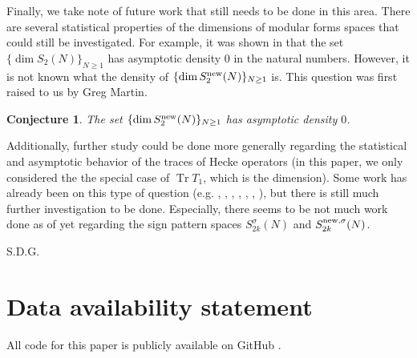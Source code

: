 \documentclass[12pt,letterpaper,reqno]{amsart}
\newtheorem{conjecture}[theorem]{Conjecture}
\theoremstyle{definition}
\numberwithin{equation}{section}
\numberwithin{figure}{section}
\numberwithin{table}{section}
\DeclareMathOperator{\Tr}{Tr}
\newcommand{\nw}{{\textnormal{new}}}
\begin{document}
Finally, we take note of future work that still needs to be done in this area. There are several statistical properties of the dimensions of modular forms spaces that could still be investigated. For example, it was shown in \cite{csirik} that the set $\{ \dim S_2(N) \}_{N\ge 1}$ has asymptotic density $0$ in the natural numbers. However, it is not known what the density of $\{ \dim S_2^\nw(N) \}_{N\ge 1}$ is. This question was first raised to us by Greg Martin.
\begin{conjecture}
    The set $\{ \dim S_2^\nw(N) \}_{N\ge 1}$ has asymptotic density $0$.
\end{conjecture}

Additionally, further study could be done more generally regarding the statistical and asymptotic behavior of the traces of Hecke operators (in this paper, we only considered the the special case of $\Tr T_1$, which is the dimension). Some work has already been on this type of question (e.g. \cite{rouse}, \cite{chiriac}, \cite{chiriac-jorza}, \cite{nonrep}, \cite{ross-xue}, \cite{nonvan-new}, \cite{rth-coeff}), but there is still much further investigation to be done. Especially, there seems to be not much work done as of yet regarding the sign pattern spaces $S_{2k}^\sigma(N)$ and  $S_{2k}^{\nw,\sigma}(N)$.















\begin{flushright} S.D.G.\end{flushright}





\section*{Data availability statement}
All code for this paper is publicly available on GitHub \cite{ross-code}.




\end{document}
